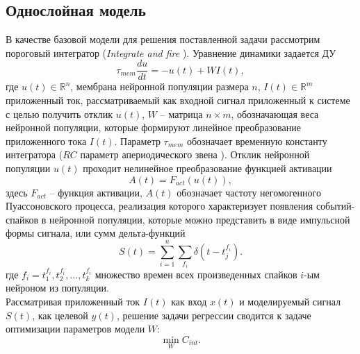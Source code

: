 \subsection{Однослойная модель}
\indent В качестве базовой модели для решения поставленной задачи рассмотрим пороговый интегратор (\textit{Integrate and fire} \cite{burkitt2006review}). Уравнение динамики задается ДУ
\begin{equation}
\tau_{mem} \frac{du}{dt} = -u(t) + W I(t),
\end{equation}
где $u(t) \in \mathbb{R}^{n}$, мембрана нейронной популяции размера $n$, $I(t) \in \mathbb{R}^{m}$ приложенный ток, рассматриваемый как входной сигнал приложенный к системе с целью получить отклик $u(t)$, $W$ -- матрица $n \times m$, обозначающая веса нейронной популяции, которые формируют линейное преобразование приложенного тока $I(t)$. Параметр $\tau_{mem}$ обозначает временную константу интегратора ($RC$ параметр апериодического звена \cite{auto_control_theory}). Отклик нейронной популяции $u(t)$ проходит нелинейное преобразование функцией активации
\begin{equation} \label{eq:p2_2_act}
A(t) = F_{act}(u(t)),
\end{equation}
здесь $F_{act}$ -- функция активации, $A(t)$ обозначает частоту негомогенного Пуассоновского процесса, реализация которого характеризует появления событий-спайков в нейронной популяции, которые можно представить в виде импульсной формы сигнала, или сумм дельта-функций
\begin{equation} \label{eq:p2_2_poiss}
S(t) = \sum_{i=1}^n \sum_{f_{i}} \delta(t - t_{j}^{f_{i}}).
\end{equation}
где $f_{i} = {t_{1}^{f_{i}}, t_{2}^{f_{i}}, \dots, t_{k}^{f_{i}}}$ множество времен всех произведенных спайков $i$-ым нейроном из популяции.\\
\indent Рассматривая приложенный ток $I(t)$ как вход $x(t)$ и моделируемый сигнал $S(t)$, как целевой $y(t)$, решение задачи регрессии сводится к задаче оптимизации параметров модели $W$:
\begin{equation}
\min_{W} C_{int}.
\end{equation}
